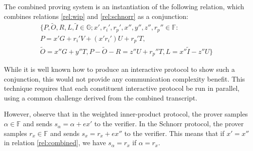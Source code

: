 \documentclass{article}
\theoremstyle{definition}
\newcommand{\GG}{\mathbb{G}}
\newcommand{\FF}{\mathbb{F}}
\newcommand{\wt}[1]{\widetilde{#1}}
\begin{document}
The combined proving system is an instantiation of the following relation, which combines relations \ref{rel:wip} and \ref{rel:schnorr} as a conjunction:
\begin{multline}
	\label{rel:combined}
	\Big\{ P, \wt{O}, R, L, \wt{I} \in \GG ; x', r_i', r_p', x'', y'', z'', r_p'' \in \FF : \\
	P = x' G + r_i' V + (x' r_i') U + r_p' T, \\
	\wt{O} = x'' G + y'' T, P - \wt{O} - R = z'' U + r_p'' T, L = x'' \wt{I} - z'' U \Big\}
\end{multline}

While it is well known how to produce an interactive protocol to show such a conjunction, this would not provide any communication complexity benefit.
This technique requires that each constituent interactive protocol be run in parallel, using a common challenge derived from the combined transcript.

However, observe that in the weighted inner-product protocol, the prover samples $\alpha \in \FF$ and sends $s_\alpha = \alpha + e x'$ to the verifier.
In the Schnorr protocol, the prover samples $r_x \in \FF$ and sends $s_x = r_x + e x''$ to the verifier.
This means that if $x' = x''$ in relation \ref{rel:combined}, we have $s_\alpha = r_x$ if $\alpha = r_x$.
\end{document}
